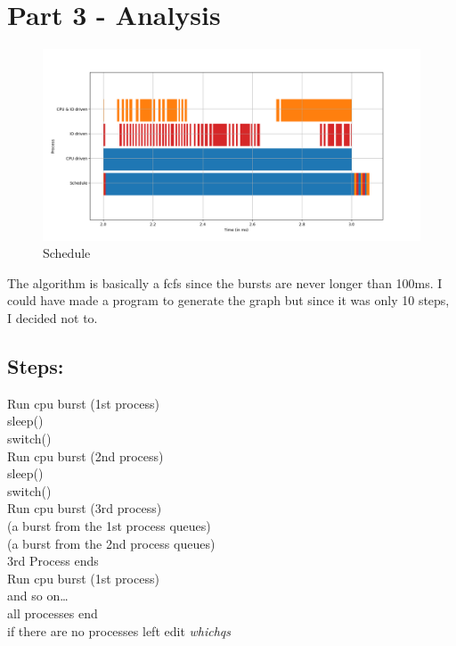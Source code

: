 \documentclass[11pt]{article}
\begin{document}
\section{Part 3 - Analysis}
\label{sec:org3979a42}
\begin{figure}[htbp]
\centering
\includegraphics[width=.9\linewidth]{./Scheduled.png}
\caption{Schedule}
\end{figure}

The algorithm is basically a fcfs since the bursts are never longer than 100ms. I could have made a program to generate the graph but since it was only 10 steps, I decided not to.\\

\subsection{Steps:}
\label{sec:org72d10d6}
Run cpu burst (1st process)\\
sleep()\\
switch()\\
Run cpu burst (2nd process)\\
sleep()\\
switch()\\
Run cpu burst (3rd process)\\
(a burst from the 1st process queues)\\
(a burst from the 2nd process queues)\\
3rd Process ends\\
Run cpu burst (1st process)\\
and so on\ldots{}\\
all processes end\\
if there are no processes left edit \emph{whichqs}\\
\end{document}
